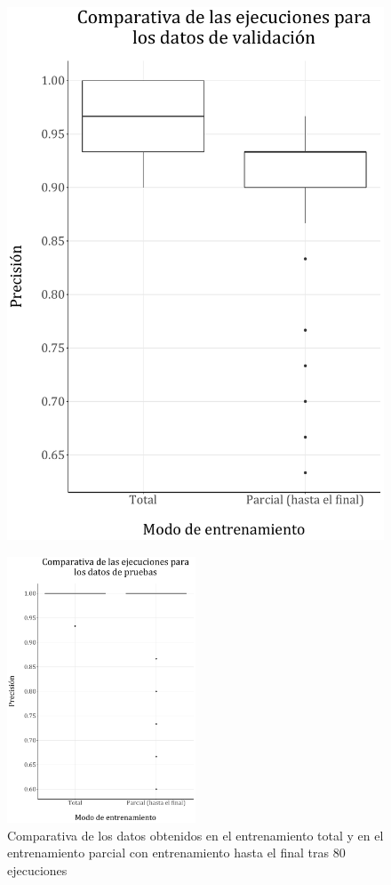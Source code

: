 \documentclass[spanish,a4paper,12pt,twoside]{report}
\begin{document}
\begin{figure}[H]
\begin{minipage}{0.49\textwidth}
      \includegraphics[width = 1\linewidth]{resources/Fig20_2.pdf}
    \end{minipage}
  \end{figure}
  \begin{figure}[H]
    \centering
    \includegraphics[width = 0.5\textwidth]{resources/Fig20_3.pdf}
    \caption{Comparativa de los datos obtenidos en el entrenamiento total y en el entrenamiento parcial con entrenamiento hasta el final tras 80 ejecuciones}
    \label{fig:20}
  \end{figure} \par
  
\end{document}
